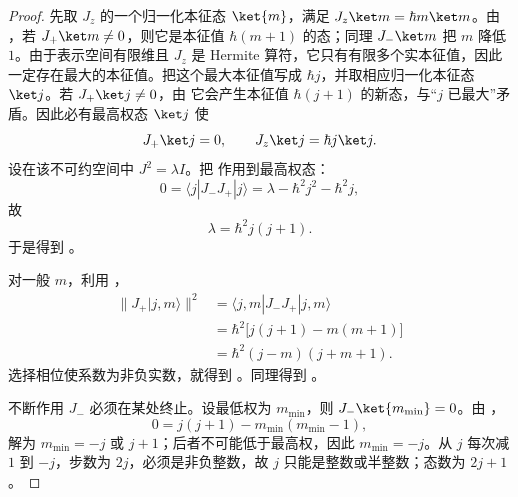 \begin{proof}
先取 $J_z$ 的一个归一化本征态 $\ket{m}$，满足 $J_z\ket m=\hbar m\ket m$。由 ，若 $J_+\ket m\neq0$，则它是本征值 $\hbar(m+1)$ 的态；同理 $J_-\ket m$ 把 $m$ 降低 $1$。由于表示空间有限维且 $J_z$ 是 Hermite 算符，它只有有限多个实本征值，因此一定存在最大的本征值。把这个最大本征值写成 $\hbar j$，并取相应归一化本征态 $\ket j$。若 $J_+\ket j\neq0$，由  它会产生本征值 $\hbar(j+1)$ 的新态，与“$j$ 已最大”矛盾。因此必有最高权态 $\ket j$ 使
\[
J_+\ket j=0,
\qquad J_z\ket j=\hbar j\ket j.
\]
设在该不可约空间中 $J^2=\lambda I$。把  作用到最高权态：
\[
0=\langle j|J_-J_+|j\rangle
=\lambda-\hbar^2j^2-\hbar^2j,
\]
故
\[
\lambda=\hbar^2j(j+1).
\]
于是得到 。

对一般 $m$，利用 ，
\begin{align*}
\|J_+\lvert j,m\rangle\|^2
&=\langle j,m|J_-J_+|j,m\rangle\\
&=\hbar^2\bigl[j(j+1)-m(m+1)\bigr]\\
&=\hbar^2(j-m)(j+m+1).
\end{align*}
选择相位使系数为非负实数，就得到 。同理得到 。

不断作用 $J_-$ 必须在某处终止。设最低权为 $m_\mathrm{min}$，则 $J_-\ket{m_\mathrm{min}}=0$。由 ，
\[
0=j(j+1)-m_\mathrm{min}(m_\mathrm{min}-1),
\]
解为 $m_\mathrm{min}=-j$ 或 $j+1$；后者不可能低于最高权，因此 $m_\mathrm{min}=-j$。从 $j$ 每次减 $1$ 到 $-j$，步数为 $2j$，必须是非负整数，故 $j$ 只能是整数或半整数；态数为 $2j+1$。


\end{proof}

